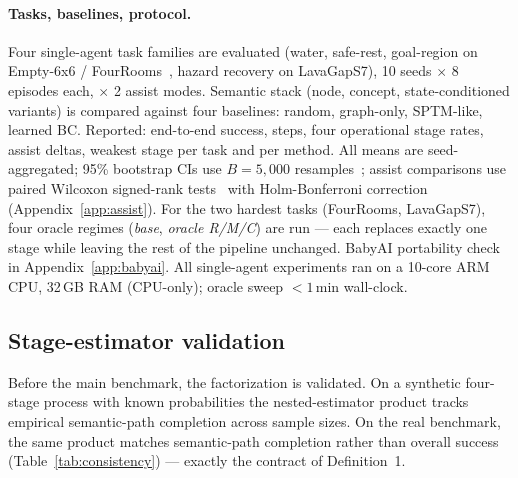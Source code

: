 \documentclass{article}
\begin{document}
\paragraph{Tasks, baselines, protocol.}
Four single-agent task families are evaluated (water, safe-rest, goal-region on Empty-6x6 / FourRooms~\citep{sutton1999between}, hazard recovery on LavaGapS7), 10 seeds $\times$ 8 episodes each, $\times$ 2 assist modes. Semantic stack (node, concept, state-conditioned variants) is compared against four baselines: random, graph-only, SPTM-like, learned BC. Reported: end-to-end success, steps, four operational stage rates, assist deltas, weakest stage per task and per method. All means are seed-aggregated; 95\% bootstrap CIs use $B{=}5{,}000$ resamples~\citep{efron1979bootstrap}; assist comparisons use paired Wilcoxon signed-rank tests~\citep{wilcoxon1945individual} with Holm-Bonferroni correction~\citep{holm1979simple} (Appendix~\ref{app:assist}). For the two hardest tasks (FourRooms, LavaGapS7), four oracle regimes (\emph{base}, \emph{oracle R/M/C}) are run — each replaces exactly one stage while leaving the rest of the pipeline unchanged. BabyAI portability check in Appendix~\ref{app:babyai}. All single-agent experiments ran on a 10-core ARM CPU, 32\,GB RAM (CPU-only); oracle sweep $<1$\,min wall-clock.

\subsection{Stage-estimator validation}
\label{sec:validation}

Before the main benchmark, the factorization is validated. On a
synthetic four-stage process with known probabilities the
nested-estimator product tracks empirical semantic-path completion
across sample sizes. On the real benchmark, the same product matches
semantic-path completion rather than overall success
(Table~\ref{tab:consistency}) --- exactly the contract of
Definition~1.
\end{document}
